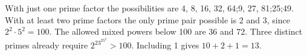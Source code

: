 With just one prime factor the possibilities are 4, 8, 16, 32, 64;9, 27, 81;25;49. With at least two prime factors the only prime pair possible is 2 and 3, since $2^2\cdot5^2=100$. The allowed mixed powers below 100 are 36 and 72. Three distinct primes already require $2^23^25^2>100$. Including 1 gives $10+2+1=\boxed{13}$.
